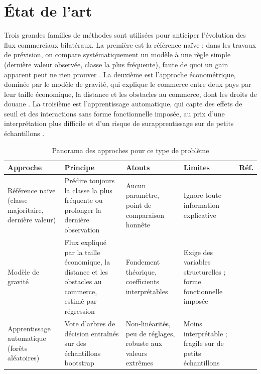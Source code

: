 \documentclass[11pt,a4paper]{article}
\begin{document}
\section{État de l'art}
\label{sec:etat}
Trois grandes familles de méthodes sont utilisées pour anticiper l'évolution des flux commerciaux bilatéraux. La première est la référence naïve : dans les travaux de prévision, on compare systématiquement un modèle à une règle simple (dernière valeur observée, classe la plus fréquente), faute de quoi un gain apparent peut ne rien prouver \cite{etat1}. La deuxième est l'approche économétrique, dominée par le modèle de gravité, qui explique le commerce entre deux pays par leur taille économique, la distance et les obstacles au commerce, dont les droits de douane \cite{etat2,lie1,lie2}. La troisième est l'apprentissage automatique, qui capte des effets de seuil et des interactions sans forme fonctionnelle imposée, au prix d'une interprétation plus difficile et d'un risque de surapprentissage sur de petits échantillons \cite{etat3}.

\begin{table}[htbp]
  \centering
  \caption{Panorama des approches pour ce type de problème}
  \label{tab:etat}
  \small
  \begin{tabular}{@{}P{3cm} P{4.3cm} P{3.5cm} P{3.5cm} l@{}}
    \toprule
    Approche & Principe & Atouts & Limites & Réf. \\
    \midrule
    Référence naïve (classe majoritaire, dernière valeur) & Prédire toujours la classe la plus fréquente ou prolonger la dernière observation & Aucun paramètre, point de comparaison honnête & Ignore toute information explicative & \cite{etat1} \\
    Modèle de gravité & Flux expliqué par la taille économique, la distance et les obstacles au commerce, estimé par régression & Fondement théorique, coefficients interprétables & Exige des variables structurelles ; forme fonctionnelle imposée & \cite{etat2,lie1,lie2} \\
    Apprentissage automatique (forêts aléatoires) & Vote d'arbres de décision entraînés sur des échantillons bootstrap & Non-linéarités, peu de réglages, robuste aux valeurs extrêmes & Moins interprétable ; fragile sur de petits échantillons & \cite{etat3} \\
    \bottomrule
  \end{tabular}
\end{table}
\end{document}
